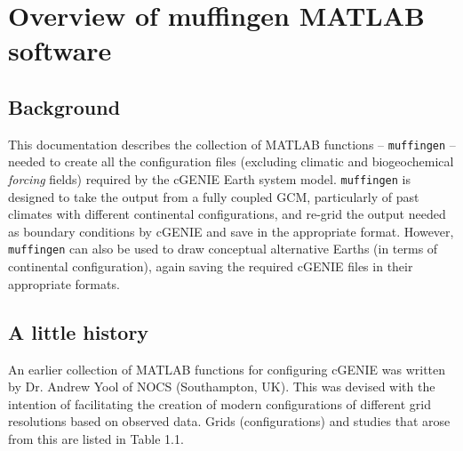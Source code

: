 \documentclass[11pt,fleqn]{book} %
\begin{document}
\tableofcontents %

\cleardoublepage %

\pagestyle{fancy} %



\chapter{Overview of muffingen MATLAB software}

\section{Background}

This documentation describes the collection of MATLAB functions -- \texttt{muffingen} --  needed to create all the configuration files (excluding climatic and biogeochemical \textit{forcing} fields) required by the cGENIE Earth system model. \texttt{muffingen} is designed to take the output from a fully coupled GCM, particularly of past climates with different continental configurations, and re-grid the output needed as boundary conditions by cGENIE and save in the appropriate format. However, \texttt{muffingen} can also be used to draw conceptual alternative Earths (in terms of continental configuration), again saving the required cGENIE files in their appropriate formats.


\section{A little history}

An earlier collection of MATLAB functions for configuring cGENIE was written by Dr. Andrew Yool of NOCS (Southampton, UK). This was  devised with the intention of facilitating the creation of modern configurations of different grid resolutions based on observed data. Grids (configurations) and studies that arose from this are listed in Table 1.1.
\end{document}
